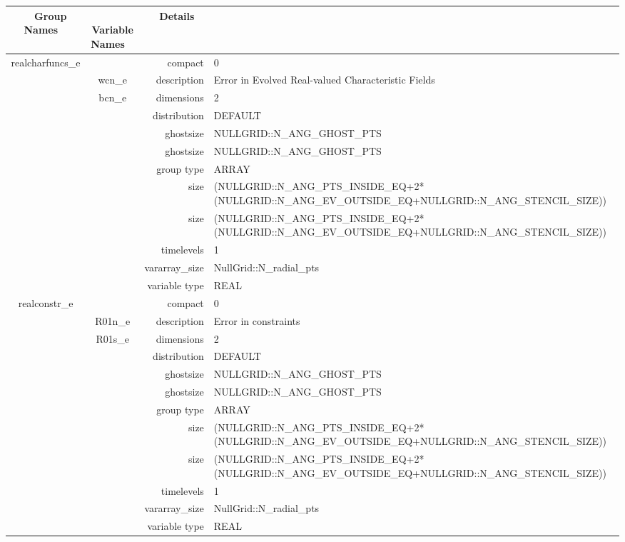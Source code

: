 \vspace{5mm}

\begin{tabular*}{150mm}{|c|c@{\extracolsep{\fill}}|rl|} \hline 
~ {\bf Group Names} ~ & ~ {\bf Variable Names} ~  &{\bf Details} ~ & ~\\ 
\hline 
realcharfuncs\_e &  & compact & 0 \\ 
 & wcn\_e & description & Error in Evolved Real-valued Characteristic Fields \\ 
 & bcn\_e & dimensions & 2 \\ 
 &  & distribution & DEFAULT \\ 
 &  & ghostsize & NULLGRID::N\_ANG\_GHOST\_PTS \\ 
& ~ & ghostsize & NULLGRID::N\_ANG\_GHOST\_PTS \\ 
 &  & group type & ARRAY \\ 
 &  & size & (NULLGRID::N\_ANG\_PTS\_INSIDE\_EQ+2*(NULLGRID::N\_ANG\_EV\_OUTSIDE\_EQ+NULLGRID::N\_ANG\_STENCIL\_SIZE)) \\ 
& ~ & size & (NULLGRID::N\_ANG\_PTS\_INSIDE\_EQ+2*(NULLGRID::N\_ANG\_EV\_OUTSIDE\_EQ+NULLGRID::N\_ANG\_STENCIL\_SIZE)) \\ 
 &  & timelevels & 1 \\ 
 &  & vararray\_size & NullGrid::N\_radial\_pts \\ 
 &  & variable type & REAL \\ 
\hline 
realconstr\_e &  & compact & 0 \\ 
 & R01n\_e & description & Error in constraints \\ 
 & R01s\_e & dimensions & 2 \\ 
 &  & distribution & DEFAULT \\ 
 &  & ghostsize & NULLGRID::N\_ANG\_GHOST\_PTS \\ 
& ~ & ghostsize & NULLGRID::N\_ANG\_GHOST\_PTS \\ 
 &  & group type & ARRAY \\ 
 &  & size & (NULLGRID::N\_ANG\_PTS\_INSIDE\_EQ+2*(NULLGRID::N\_ANG\_EV\_OUTSIDE\_EQ+NULLGRID::N\_ANG\_STENCIL\_SIZE)) \\ 
& ~ & size & (NULLGRID::N\_ANG\_PTS\_INSIDE\_EQ+2*(NULLGRID::N\_ANG\_EV\_OUTSIDE\_EQ+NULLGRID::N\_ANG\_STENCIL\_SIZE)) \\ 
 &  & timelevels & 1 \\ 
 &  & vararray\_size & NullGrid::N\_radial\_pts \\ 
 &  & variable type & REAL \\ 
\hline 

\end{tabular*}
